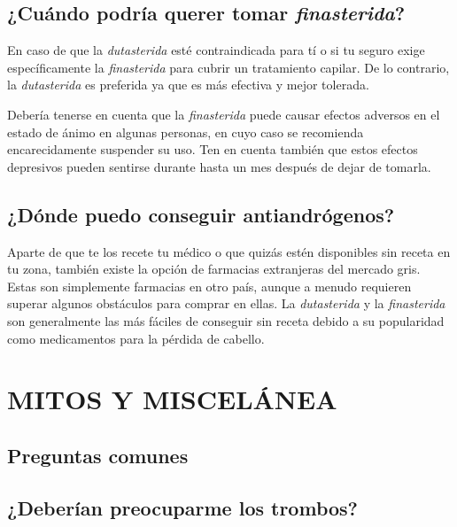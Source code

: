 \documentclass{article}
\begin{document}
\subsection{¿Cuándo podría querer tomar \textit{finasterida}?}

En caso de que la \textit{dutasterida} esté contraindicada para tí o si tu seguro exige específicamente la \textit{finasterida} para cubrir un tratamiento capilar. De lo contrario, la \textit{dutasterida} es preferida ya que es más efectiva y mejor tolerada.

Debería tenerse en cuenta que la \textit{finasterida} puede causar efectos adversos en el estado de ánimo en algunas personas, en cuyo caso se recomienda encarecidamente suspender su uso. Ten en cuenta también que estos efectos depresivos pueden sentirse durante hasta un mes después de dejar de tomarla.

\subsection{¿Dónde puedo conseguir antiandrógenos?}

Aparte de que te los recete tu médico o que quizás estén disponibles sin receta en tu zona, también existe la opción de farmacias extranjeras del mercado gris. Estas son simplemente farmacias en otro país, aunque a menudo requieren superar algunos obstáculos para comprar en ellas. La \textit{dutasterida} y la \textit{finasterida} son generalmente las más fáciles de conseguir sin receta debido a su popularidad como medicamentos para la pérdida de cabello.



\section{MITOS Y MISCELÁNEA}\label{MM}

\subsection*{Preguntas comunes}

\subsection{¿Deberían preocuparme los trombos?}\label{11-1}
\end{document}
